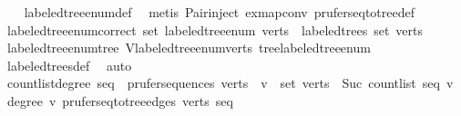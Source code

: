 \begin{isabellebody}
%
\isadelimproof
\ \ %
\endisadelimproof
%
\isatagproof
{}\isamarkupfalse%
\ labeled{\isacharunderscore}{\kern0pt}tree{\isacharunderscore}{\kern0pt}enum{\isacharunderscore}{\kern0pt}def\ \isamarkupfalse%
\ {\isacharparenleft}{\kern0pt}metis\ Pair{\isacharunderscore}{\kern0pt}inject\ ex{\isacharunderscore}{\kern0pt}map{\isacharunderscore}{\kern0pt}conv\ prufer{\isacharunderscore}{\kern0pt}seq{\isacharunderscore}{\kern0pt}to{\isacharunderscore}{\kern0pt}tree{\isacharunderscore}{\kern0pt}def{\isacharparenright}{\kern0pt}%
\endisatagproof
{\isafoldproof}%
%
\isadelimproof
\isanewline
%
\endisadelimproof
\isanewline
{}\isamarkupfalse%
\ labeled{\isacharunderscore}{\kern0pt}tree{\isacharunderscore}{\kern0pt}enum{\isacharunderscore}{\kern0pt}correct{\isacharcolon}{\kern0pt}\ {\isachardoublequoteopen}set\ {\isacharparenleft}{\kern0pt}labeled{\isacharunderscore}{\kern0pt}tree{\isacharunderscore}{\kern0pt}enum\ verts{\isacharparenright}{\kern0pt}\ {\isacharequal}{\kern0pt}\ labeled{\isacharunderscore}{\kern0pt}trees\ {\isacharparenleft}{\kern0pt}set\ verts{\isacharparenright}{\kern0pt}{\isachardoublequoteclose}\isanewline
%
\isadelimproof
\ \ %
\endisadelimproof
%
\isatagproof
{}\isamarkupfalse%
\ labeled{\isacharunderscore}{\kern0pt}tree{\isacharunderscore}{\kern0pt}enum{\isacharunderscore}{\kern0pt}tree\ V{\isacharunderscore}{\kern0pt}labeled{\isacharunderscore}{\kern0pt}tree{\isacharunderscore}{\kern0pt}enum{\isacharunderscore}{\kern0pt}verts\ tree{\isacharunderscore}{\kern0pt}labeled{\isacharunderscore}{\kern0pt}tree{\isacharunderscore}{\kern0pt}enum\ \isamarkupfalse%
\ labeled{\isacharunderscore}{\kern0pt}trees{\isacharunderscore}{\kern0pt}def\ \isamarkupfalse%
\ auto%
\endisatagproof
{\isafoldproof}%
%
\isadelimproof
%
\endisadelimproof
%
\isadelimdocument
%
\endisadelimdocument
%
\isatagdocument
%
\isamarkuptrue%
%
\endisatagdocument
{\isafolddocument}%
%
\isadelimdocument
%
\endisadelimdocument
{}\isamarkupfalse%
\ count{\isacharunderscore}{\kern0pt}list{\isacharunderscore}{\kern0pt}degree{\isacharcolon}{\kern0pt}\ {\isachardoublequoteopen}seq\ {\isasymin}\ prufer{\isacharunderscore}{\kern0pt}sequences\ verts\ {\isasymLongrightarrow}\ v\ {\isasymin}\ set\ verts\ {\isasymLongrightarrow}\ Suc\ {\isacharparenleft}{\kern0pt}count{\isacharunderscore}{\kern0pt}list\ seq\ v{\isacharparenright}{\kern0pt}\ {\isacharequal}{\kern0pt}\ degree\ v\ {\isacharparenleft}{\kern0pt}prufer{\isacharunderscore}{\kern0pt}seq{\isacharunderscore}{\kern0pt}to{\isacharunderscore}{\kern0pt}tree{\isacharunderscore}{\kern0pt}edges\ verts\ seq{\isacharparenright}{\kern0pt}{\isachardoublequoteclose}\isanewline

\end{isabellebody}
